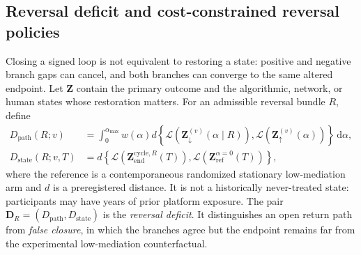\documentclass[pdflatex,sn-mathphys-num]{sn-jnl}
\newcommand{\alphamax}{\alpha_{\max}}
\newcommand{\dd}{\mathrm{d}}
\begin{document}
\subsection{Reversal deficit and cost-constrained reversal policies}

Closing a signed loop is not equivalent to restoring a state: positive and negative branch gaps can cancel, and both branches can converge to the same altered endpoint. Let $\bm Z$ contain the primary outcome and the algorithmic, network, or human states whose restoration matters. For an admissible reversal bundle $R$, define
\begin{align}
D_{\mathrm{path}}(R;v)
&=\int_0^{\alphamax}w(\alpha)
d\!\left\{\mathcal L(\bm Z_{\downarrow}^{(v)}(\alpha\mid R)),
\mathcal L(\bm Z_{\uparrow}^{(v)}(\alpha))\right\}\,\dd\alpha,
\label{eq:path-deficit}\\
D_{\mathrm{state}}(R;v,T)
&=d\!\left\{\mathcal L(\bm Z_{\mathrm{end}}^{\mathrm{cycle},R}(T)),
\mathcal L(\bm Z_{\mathrm{ref}}^{\alpha=0}(T))\right\},
\label{eq:state-deficit}
\end{align}
where the reference is a contemporaneous randomized stationary low-mediation arm and $d$ is a preregistered distance. It is not a historically never-treated state: participants may have years of prior platform exposure. The pair $\bm D_R=(D_{\mathrm{path}},D_{\mathrm{state}})$ is the \emph{reversal deficit}. It distinguishes an open return path from \emph{false closure}, in which the branches agree but the endpoint remains far from the experimental low-mediation counterfactual.
\end{document}
